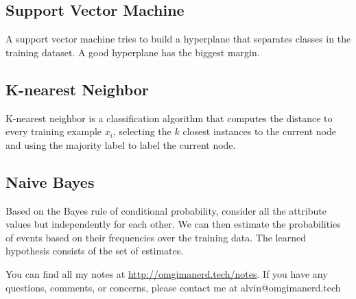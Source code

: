 \documentclass{math}
\begin{document}
\subsection*{Support Vector Machine}
A support vector machine tries to build a hyperplane that separates classes in
the training dataset. A good hyperplane has the biggest margin.

\subsection*{K-nearest Neighbor}
K-nearest neighbor is a classification algorithm that computes the distance to
every training example \( x_i \), selecting the \( k \) closest instances to the
current node and using the majority label to label the current node.

\subsection*{Naive Bayes}
Based on the Bayes rule of conditional probability, consider all the attribute
values but independently for each other. We can then estimate the probabilities
of events based on their frequencies over the training data. The learned
hypothesis consists of the set of estimates.

\begin{center}
  You can find all my notes at \url{http://omgimanerd.tech/notes}. If you have
  any questions, comments, or concerns, please contact me at
  alvin@omgimanerd.tech
\end{center}
\end{document}
